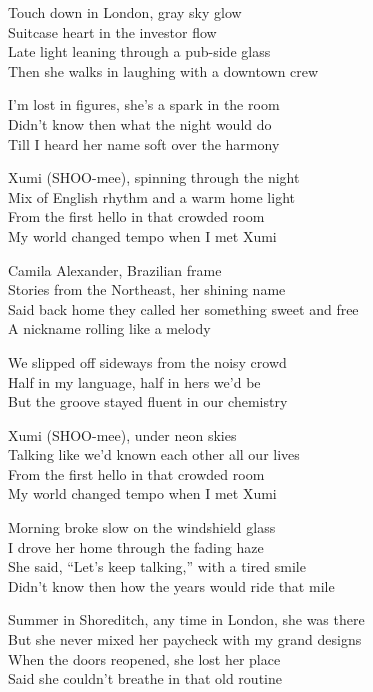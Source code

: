\begin{lyrics}
Touch down in London, gray sky glow\\
Suitcase heart in the investor flow\\
Late light leaning through a pub-side glass\\
Then she walks in laughing with a downtown crew

I’m lost in figures, she’s a spark in the room\\
Didn’t know then what the night would do\\
Till I heard her name soft over the harmony

Xumi (SHOO-mee), spinning through the night\\
Mix of English rhythm and a warm home light\\
From the first hello in that crowded room\\
My world changed tempo when I met Xumi

Camila Alexander, Brazilian frame\\
Stories from the Northeast, her shining name\\
Said back home they called her something sweet and free\\
A nickname rolling like a melody

We slipped off sideways from the noisy crowd\\
Half in my language, half in hers we’d be\\
But the groove stayed fluent in our chemistry

Xumi (SHOO-mee), under neon skies\\
Talking like we’d known each other all our lives\\
From the first hello in that crowded room\\
My world changed tempo when I met Xumi

Morning broke slow on the windshield glass\\
I drove her home through the fading haze\\
She said, “Let’s keep talking,” with a tired smile\\
Didn’t know then how the years would ride that mile

Summer in Shoreditch, any time in London, she was there\\
But she never mixed her paycheck with my grand designs\\
When the doors reopened, she lost her place\\
Said she couldn’t breathe in that old routine


\end{lyrics}
